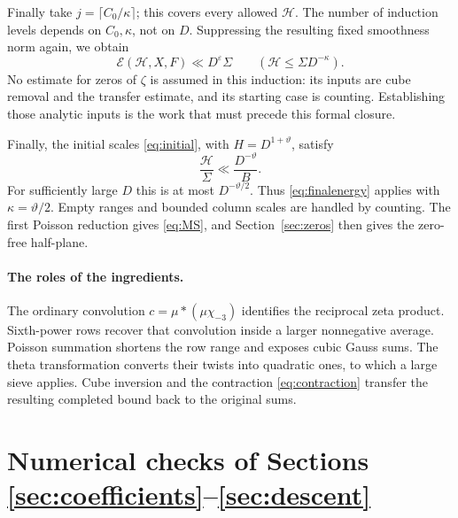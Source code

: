 \documentclass[11pt]{article}
\newcommand{\ch}{\chi_{-3}}
\newcommand{\E}{\mathcal E}
\numberwithin{equation}{section}
\begin{document}
Finally take $j=\lceil C_0/\kappa\rceil$; this covers every allowed
$\mathcal H$. The number of induction levels depends on $C_0,\kappa$,
not on $D$. Suppressing the resulting fixed smoothness norm again,
we obtain
\begin{equation}\label{eq:finalenergy}
 \E(\mathcal H,X,F)\ll D^\varepsilon\Sigma
 \qquad(\mathcal H\le\Sigma D^{-\kappa}).
\end{equation}
No estimate for zeros of $\zeta$ is assumed in this induction: its
inputs are cube removal and the transfer estimate, and its starting
case is counting. Establishing those analytic inputs is the work that
must precede this formal closure.

Finally, the initial scales \eqref{eq:initial}, with $H=D^{1+\vartheta}$,
satisfy
\begin{equation}\label{eq:initialratio}
 \frac{\mathcal H}{\Sigma}\ll\frac{D^{-\vartheta}}B.
\end{equation}
For sufficiently large $D$ this is at most $D^{-\vartheta/2}$.
Thus \eqref{eq:finalenergy} applies with $\kappa=\vartheta/2$.
Empty ranges and bounded column scales are handled by counting.
The first Poisson reduction gives \eqref{eq:MS}, and
Section~\ref{sec:zeros} then gives the zero-free half-plane.

\paragraph{The roles of the ingredients.}
The ordinary convolution $c=\mu*(\mu\ch)$ identifies the reciprocal
zeta product. Sixth-power rows recover that convolution inside a larger
nonnegative average. Poisson summation shortens the row range and exposes
cubic Gauss sums. The theta transformation converts their twists into
quadratic ones, to which a large sieve applies. Cube inversion and the
contraction \eqref{eq:contraction} transfer the resulting completed bound
back to the original sums.

\section{Numerical checks of Sections \ref{sec:coefficients}--\ref{sec:descent}}\label{sec:numerics}
\end{document}
